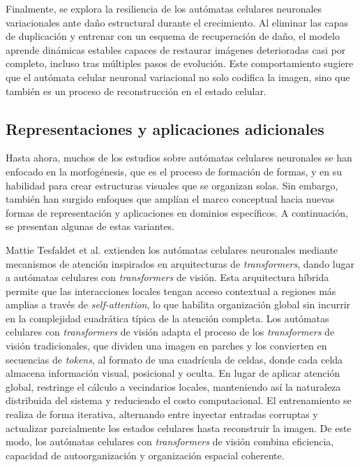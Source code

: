 Finalmente, se explora la resiliencia de los autómatas celulares neuronales variacionales ante daño estructural durante el crecimiento. Al eliminar las capas de duplicación y entrenar con un esquema de recuperación de daño, el modelo aprende dinámicas estables capaces de restaurar imágenes deterioradas casi por completo, incluso tras múltiples pasos de evolución. Este comportamiento sugiere que el autómata celular neuronal variacional no solo codifica la imagen, sino que también es un proceso de reconstrucción en el estado celular.

\subsection{Representaciones y aplicaciones adicionales}

Hasta ahora, muchos de los estudios sobre autómatas celulares neuronales se han enfocado en la morfogénesis, que es el proceso de formación de formas, y en su habilidad para crear estructuras visuales que se organizan solas. Sin embargo, también han surgido enfoques que amplían el marco conceptual hacia nuevas formas de representación y aplicaciones en dominios específicos. A continuación, se presentan algunas de estas variantes.

Mattie Tesfaldet et al. \cite{ViTCA} extienden los autómatas celulares neuronales mediante mecanismos de atención inspirados en arquitecturas de \textit{transformers}, dando lugar a autómatas celulares con \textit{transformers} de visión. Esta arquitectura híbrida permite que las interacciones locales tengan acceso contextual a regiones más amplias a través de \textit{self-attention}, lo que habilita organización global sin incurrir en la complejidad cuadrática típica de la atención completa. Los autómatas celulares con \textit{transformers} de visión adapta el proceso de los \textit{transformers} de visión tradicionales, que dividen una imagen en parches y los convierten en secuencias de \textit{tokens}, al formato de una cuadrícula de celdas, donde cada celda almacena información visual, posicional y oculta. En lugar de aplicar atención global, restringe el cálculo a vecindarios locales, manteniendo así la naturaleza distribuida del sistema y reduciendo el costo computacional. El entrenamiento se realiza de forma iterativa, alternando entre inyectar entradas corruptas y actualizar parcialmente los estados celulares hasta reconstruir la imagen. De este modo, los autómatas celulares con \textit{transformers} de visión combina eficiencia, capacidad de autoorganización y organización espacial coherente.

